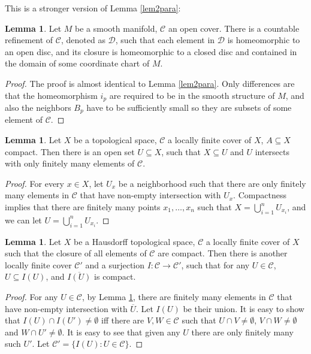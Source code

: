 \documentclass{article}
\theoremstyle{definition}
\newtheorem{lem}[thm]{Lemma}
\begin{document}
This is a stronger version of Lemma \ref{lem2para}:

\begin{lem}\label{lem3pu}
    Let $M$ be a smooth manifold, $\mathcal{C}$ an open cover. There is a countable refinement of $\mathcal{C}$, denoted as $\mathcal{D}$, such that each element in $\mathcal{D}$ is homeomorphic to an open disc, and its closure is homeomorphic to a closed disc and contained in the domain of some coordinate chart of $M$. 
\end{lem}

\begin{proof}
 The proof is almost identical to Lemma \ref{lem2para}. Only differences are that the homeomorphism $i_p$ are required to be in the smooth structure of $M$, and also the neighbors $B_p$ have to be sufficiently small so they are subsets of some element of $\mathcal{C}$.
\end{proof}

\begin{lem}\label{lem4pu}
    Let $X$ be a topological space, $\mathcal{C}$ a locally finite cover of $X$, $A\subseteq X$ compact. Then there is an open set $U\subseteq X$, such that $X\subseteq U$ and $U$ intersects with only finitely many elements of $\mathcal{C}$.
\end{lem}

\begin{proof}
    For every $x\in X$, let $U_x$ be a neighborhood such that there are only finitely many elements in $\mathcal{C}$ that have non-empty intersection with $U_x$. Compactness implies that there are finitely many points $x_1, \dots, x_n$ such that $X=\bigcup_{i=1}^n U_{x_i}$, and we can let $U=\bigcup_{i=1}^n U_{x_i}$.
\end{proof}

\begin{lem}\label{lem5pu}
    Let $X$ be a Hausdorff topological space, $\mathcal{C}$ a locally finite cover of $X$ such that the closure of all elements of $\mathcal{C}$ are compact. Then there is another locally finite cover $\mathcal{C}'$ and a surjection $I: \mathcal{C}\rightarrow \mathcal{C}'$, such that for any $U\in \mathcal{C}$, $U\subseteq I(U)$, and $\overline{I(U)}$ is compact.
\end{lem}

\begin{proof}
    For any $U\in \mathcal{C}$, by Lemma \ref{lem4pu}, there are finitely many elements in $\mathcal{C}$ that have non-empty intersection with $\overline{U}$. Let $I(U)$ be their union. It is easy to show that $I(U)\cap I(U')\not=\emptyset$ iff there are $V, W\in\mathcal{C}$ such that $U\cap V\not=\emptyset$, $V\cap W\not=\emptyset$ and $W\cap U'\not=\emptyset$. It is easy to see that given any $U$ there are only finitely many such $U'$. Let $\mathcal{C}'=\{I(U): U\in\mathcal{C}\}$.
\end{proof}
\end{document}
